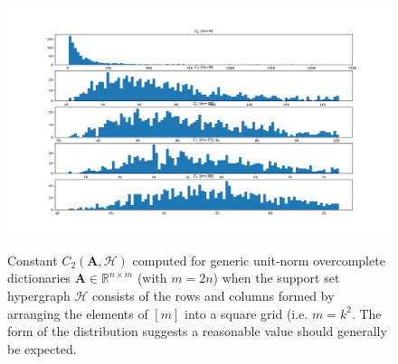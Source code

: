 \begin{figure}\label{reasonableC2}
\begin{center}
\includegraphics[width=1 \linewidth]{figures/C2_m36_nt1000.pdf}
\caption{Constant $C_2(\mathbf{A}, \mathcal{H})$ computed for generic unit-norm overcomplete dictionaries $\mathbf{A} \in \mathbb{R}^{n \times m}$ (with $m = 2n$) when the support set hypergraph $\mathcal{H}$ consists of the rows and columns formed by arranging  the elements of $[m]$ into a square grid (i.e. $m = k^2$. The form of the distribution suggests a reasonable value should generally be expected.}
\vspace{-.6 cm}
\label{samples_vs_m}
\end{center}
\end{figure}


